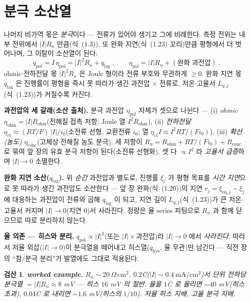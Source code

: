 \documentclass[11pt,a4paper]{article}
\newtheorem*{verifybox}{검산}
\newcommand{\eq}{\mathrm{eq}}
\newcommand{\hys}{\mathrm{hys}}
\newcommand{\pol}{\mathrm{pol}}
\newcommand{\ohm}{\mathrm{ohm}}
\newcommand{\lag}{\mathrm{lag}}
\begin{document}
\section{분극 소산열}\label{sec:h_pol}
나머지 비가역 몫은 \emph{분극}이다 — 전류가 있어야 생기고 그에 비례한다. 측정 전위는 내부 전위에서 $|I|R_n$
만큼(식~(1.3)), 또 완화 지연(식~(1.23) 꼬리)만큼 평형에서 더 벗어나며, 그 이탈이 소산열이 된다:
\begin{equation}
\boxed{\;q_\pol=I\,\eta_\pol=|I|^2R_n+q_\lag\;,\qquad \eta_\pol=|I|R_n+(\text{완화 과전압})\;.}
\label{eq:h_qpol}
\end{equation}
ohmic$\cdot$전하전달 몫 $|I|^2R_n$ 은 Joule 형이라 전류 부호와 무관하게 $\ge0$. 완화 지연 몫 $q_\lag$ 은 진행률이
평형을 즉시 못 따라가 생긴 과전압 $\times$ 전류로, 저온$\cdot$고율서 $L_{q,j}$(식~(1.23))가 커질수록 커진다.

\textbf{과전압의 세 갈래(소산 출처).} 분극 과전압 $\eta_\pol$ 자체가 셋으로 나뉜다 — (i) \emph{ohmic}
$\eta_\ohm=|I|R_\ohm$(전해질$\cdot$접촉 저항; Joule 열 $I^2R_\ohm$), (ii) \emph{전하전달} $\eta_\mathrm{ct}\approx
(RT/F)\,|I|/i_0$(소전류 선형, 교환전류 $i_0$; 열 $\eta_\mathrm{ct}I\approx I^2RT/(Fi_0)$), (iii) \emph{확산(농도)}
$\eta_\mathrm{conc}$(고체상$\cdot$전해질 농도 분극). 세 저항이 $R_n=R_\ohm+RT/(Fi_0)+R_\mathrm{conc}$ 로 묶여 앞
장의 유효 분극 저항이 된다(소전류 선형화). 셋 다 $\propto I^2$ 라 \emph{고율서 급증}하며 $|I|\to0$ 소멸한다.

\textbf{완화 지연 소산($q_\lag$).} 위 \emph{순간} 과전압과 별도로, 진행률 $\xi_j$ 가 평형 목표를 \emph{시간 지연}으로
못 따라가 생긴 과전압도 소산한다 — 앞 장 완화(식~(1.20))의 지연 $r_j=\xi_{\eq,j}-\xi_j$ 에 대응하는 과전압이
전류와 곱해 $q_\lag$ 이 되고, 지연 길이 $L_{q,j}$(식~(1.23))가 큰 저온$\cdot$고율서 커지며 $|I|\to0$(지연 $0$)서
사라진다. 정량은 율 series 피팅으로 $R_n$ 과 함께 닫으므로 따로 분리하지 않는다.

\textbf{율 의존 — 히스와 분리.} $q_\pol\propto|I|^2$(또는 $|I|\times$과전압)라 $|I|\to0$ 에서 \emph{사라진다}.
따라서 저율 외삽($|I|\to0$)이 분극열을 떼어내고 히스열($q_\hys$, 율 무관)만 남긴다 — 직전 장의 ``참/분극
분리''가 발열에도 그대로 적용된다.
\begin{verifybox}
\textbf{worked example.} $R_n\sim20\ \Omega\,\mathrm{cm^2}$, $0.2$C($|I|\sim0.4\ \mathrm{mA/cm^2}$)서 단위 전하당
분극열 $=|I|R_n\approx8$ mV — 히스 $16$ mV 의 절반. 율을 $1$C 로 올리면 $\sim40$ mV(히스 초과), $0.04$C 로 내리면
$\sim1.6$ mV(히스의 $1/10$). \emph{저율 히스 지배, 고율 분극 지배}.
\end{verifybox}
\end{document}
